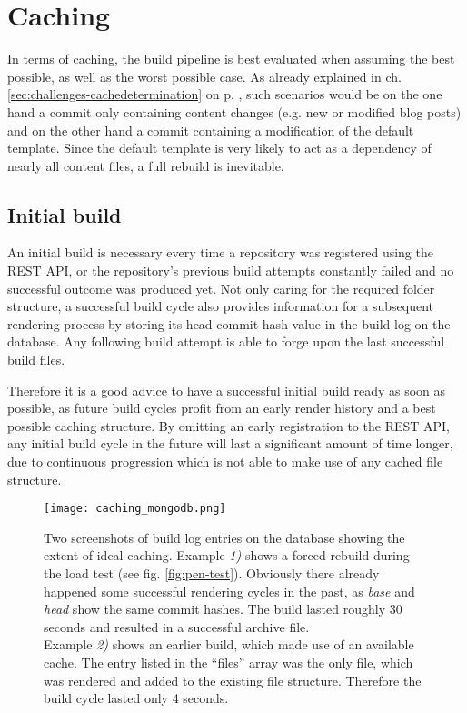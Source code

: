 \section{Caching}
\label{sec:caching}

In terms of caching, the build pipeline is best evaluated when assuming the best possible, as well as the worst possible case. As already explained in ch. \ref{sec:challenges-cachedetermination} on p. \pageref{sec:challenges-cachedetermination}, such scenarios would be on the one hand a commit only containing content changes (e.g. new or modified blog posts) and on the other hand a commit containing a modification of the default template. Since the default template is very likely to act as a dependency of nearly all content files, a full rebuild is inevitable.

\subsection{Initial build}
An initial build is necessary every time a repository was registered using the REST API, or the repository's previous build attempts constantly failed and no successful outcome was produced yet. Not only caring for the required folder structure, a successful build cycle also provides information for a subsequent rendering process by storing its head commit hash value in the build log on the database. Any following build attempt is able to forge upon the last successful build files.

Therefore it is a good advice to have a successful initial build ready as soon as possible, as future build cycles profit from an early render history and a best possible caching structure. By omitting an early registration to the REST API, any initial build cycle in the future will last a significant amount of time longer, due to continuous progression which is not able to make use of any cached file structure.

\begin{figure} %
    \centering
    \texttt{[image: caching\_mongodb.png]}
    \caption{Two screenshots of build log entries on the database showing the extent of ideal caching. Example \emph{1)} shows a forced rebuild during the load test (see fig. \ref{fig:pen-test}). Obviously there already happened some successful rendering cycles in the past, as \emph{base} and \emph{head} show the same commit hashes. The build lasted roughly 30 seconds and resulted in a successful archive file.\\
    Example \emph{2)} shows an earlier build, which made use of an available cache. The entry listed in the ``files'' array was the only file, which was rendered and added to the existing file structure. Therefore the build cycle lasted only 4 seconds.}
    \label{fig:caching-mongodb}
\end{figure}
%

